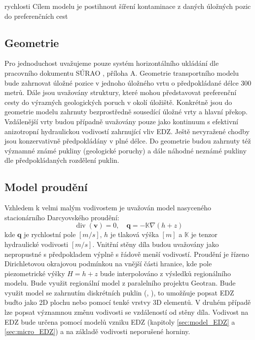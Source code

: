 \documentclass{article}
\def\grad{\nabla}
\def\div{\operatorname{div}}
\def\vc#1{\mathbf{\boldsymbol{#1}}}     %
\def\tn#1{{\mathbb{#1}}}    %
\begin{document}
rychlosti Cílem modelu je postihnout šíření kontaminace z daných úložných pozic do preferenčních cest


\subsection{Geometrie}
\label{sec:transport_geometrie}
 Pro jednoduchost uvažujeme pouze systém horizontálního ukládání dle pracovního dokumentu SÚRAO , příloha A. 
 Geometrie transportního modelu bude zahrnovat úložné pozice v jednoho úložného vrtu o předpokládané délce 300 metrů. 
 Dále jsou uvažovány  struktury, které mohou představovat preferenční cesty do výrazných geologických poruch v okolí úložiště. 
 Konkrétně jsou do geometrie modelu zahrnuty bezprostředně sousedící úložné vrty a hlavní překop. Vzdálenější vrty budou případně 
 uvažovány pouze jako kontinuum s efektivní anizotropní hydraulickou vodivostí zahrnující vliv EDZ. 
Ještě nevyražené chodby jsou konzervativně předpokládány v plné délce. Do geometrie budou zahrnuty též významné známé pukliny 
(geologické poruchy) a dále náhodné neznámé pukliny dle předpokládaných rozdělení puklin.


\subsection{Model proudění}
\label{sec:transport_flow}
Vzhledem k velmi malým vodivostem je uvažován model nasyceného stacionárního Darcyovského proudění:
\[
    \div(\vc v) = 0, \quad \vc q = -\tn K \grad (h + z)
\]
kde $\vc q$ je rychlostní pole $[m/s]$, $h$ je tlaková výška $[m]$ a $\tn K$ je tenzor hydraulické vodivosti $[m/s]$. 
Vnitřní stěny díla budou uvažovány jako nepropustné s předpokladem výplně s řádově menší vodivostí. 
Proudění je řízeno Dirichletovou okrajovou podmínkou na vnější části hranice, kde pole piezometrické výšky $H = h + z$ 
bude interpolováno z výsledků regionálního modelu. Bude využit regionální model z paralelního projektu Geotran.
Bude využit model se zahrnutím diskrétních puklin (\cite{brezina_analysis_2015}, \cite{flow123d}), to umožňuje popsat EDZ buďto jako 2D plochu nebo pomocí 
tenké vrstvy 3D elementů. V druhém případě lze popsat významnou změnu vodivosti se vzdáleností od stěny díla.
Vodivost na EDZ bude určena pomocí modelů vzniku EDZ (kapitoly \ref{sec:model_EDZ} a \ref{sec:micro_EDZ}) 
a na základě vodivosti neporušené horniny.
\end{document}
